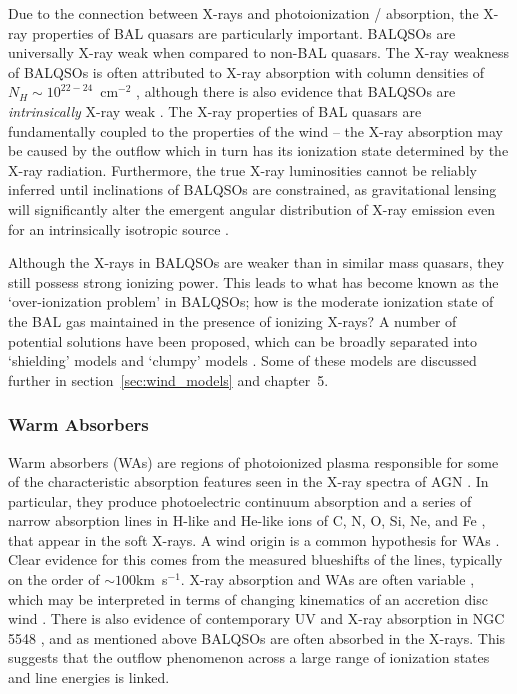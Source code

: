 Due to the connection between X-rays and photoionization / absorption, the 
X-ray properties of BAL quasars are particularly important. BALQSOs
are universally X-ray weak when compared to non-BAL quasars. 
The X-ray weakness of BALQSOs is often attributed to X-ray absorption 
with column densities of $N_H \sim 10^{22-24}$~cm$^{-2}$ 
\citep{gallagher1999,gallagher2002,green2001,grupe2003,stalin2011},
although there is also evidence that BALQSOs are {\em intrinsically}
X-ray weak \citep{sabra2001,clavel2006,morabito2013}.
The X-ray properties of BAL quasars are fundamentally coupled to 
the properties of the wind -- the X-ray absorption may be caused by 
the outflow which in turn has its ionization state 
determined by the X-ray radiation. Furthermore, the true X-ray 
luminosities cannot be reliably inferred until inclinations of BALQSOs are
constrained, as gravitational lensing will significantly alter the
emergent angular distribution of X-ray emission even for an intrinsically
isotropic source \citep{chen2013a, chen2013b}.

Although the X-rays in BALQSOs are weaker than in similar mass quasars,
they still possess strong ionizing power. This leads to what has become
known as the `over-ionization problem' in BALQSOs; how is the moderate 
ionization state of the BAL gas maintained in the presence of ionizing 
X-rays? A number of potential solutions have been proposed, which can be 
broadly separated into `shielding' models \citep{MCGV95,PK04} and `clumpy'
models \citep{dekool1995,hamann2013}. Some of these models are discussed
further in section~\ref{sec:wind_models} and chapter~5.

\subsubsection{Warm Absorbers}

Warm absorbers (WAs) are regions of photoionized plasma responsible for some
of the characteristic absorption features seen in the X-ray spectra of AGN 
\citep{reynolds1995}.
In particular, they produce photoelectric continuum absorption 
\citep[e.g.][]{halpern1984,cappi1996,kriss1996}
and a series of narrow absorption lines in H-like and He-like ions of 
C, N, O, Si, Ne, and Fe \citep{kaastra2000}, that appear in the soft X-rays.
A wind origin is a common hypothesis for WAs 
\citep[e.g.][]{krolikkriss2001}. Clear evidence for this 
comes from the measured blueshifts of the lines, typically on the order of 
$\sim100$km~s$^{-1}$. X-ray absorption and WAs are often
variable \citep{fabian1994,otani1996}, which may be interpreted in terms of 
changing kinematics of an accretion disc wind \citep{connolly2014}. 
There is also evidence of contemporary UV and X-ray absorption 
in NGC 5548 \citep{kaastra}, and as mentioned above BALQSOs 
are often absorbed in the X-rays. This suggests that the outflow phenomenon 
across a large range of ionization states and line energies is linked. 

